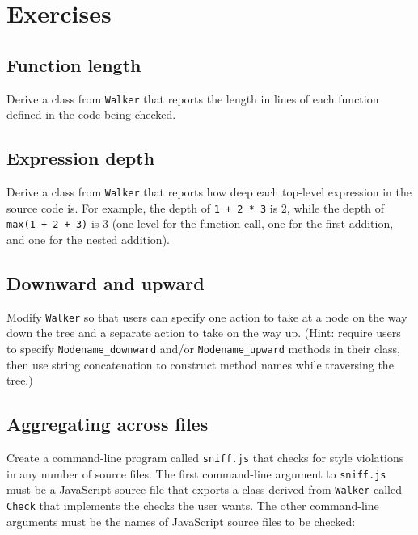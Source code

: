 \documentclass[krantzl]{krantz}
\begin{document}
\vspace{\baselineskip}


\section{Exercises}\label{style-checker-exercises}

\subsection*{Function length}


Derive a class from \texttt{Walker} that reports the length in lines of each function defined in the code being checked.

\subsection*{Expression depth}


Derive a class from \texttt{Walker} that reports how deep each top-level expression in the source code is.
For example,
the depth of \texttt{1 + 2 * 3} is 2,
while the depth of \texttt{max(1 + 2 + 3)} is 3
(one level for the function call, one for the first addition, and one for the nested addition).

\subsection*{Downward and upward}


Modify \texttt{Walker} so that users can specify
one action to take at a node on the way down the tree
and a separate action to take on the way up.
(Hint: require users to specify \texttt{Nodename\_downward} and/or \texttt{Nodename\_upward} methods in their class,
then use string concatenation to construct method names while traversing the tree.)

\subsection*{Aggregating across files}


Create a command-line program called \texttt{sniff.js}
that checks for style violations in any number of source files.
The first command-line argument to \texttt{sniff.js} must be a JavaScript source file
that exports a class derived from \texttt{Walker} called \texttt{Check}
that implements the checks the user wants.
The other command-line arguments must be the names of JavaScript source files to be checked:
\end{document}

